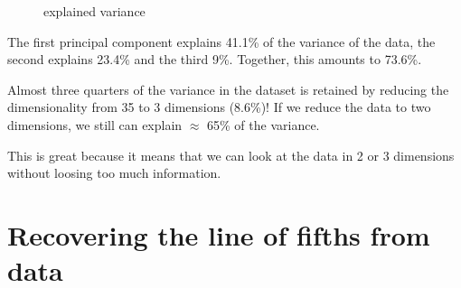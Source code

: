 \documentclass[letterpaper,10pt,english]{sphinxmanual}
\begin{document}
\begin{figure}[htbp]
\centering
\capstart

\noindent{}
\caption{explained variance}\label{\detokenize{data-driven_music_history:id3}}\end{figure}

\begin{sphinxVerbatim}[commandchars=\\\{\}]
\PYG{p}{[}\PYG{p}{]}
\end{sphinxVerbatim}

\begin{sphinxVerbatim}[commandchars=\\\{\}]
\PYG{p}{[}    \PYG{p}{]}
\end{sphinxVerbatim}

The first principal component explains 41.1\% of the variance of the
data, the second explains 23.4\% and the third 9\%. Together, this amounts
to 73.6\%.

Almost three quarters of the variance in the dataset is retained by
reducing the dimensionality from 35 to 3 dimensions (8.6\%)! If we reduce
the data to two dimensions, we still can explain \(\approx\) 65\% of
the variance.

This is great because it means that we can look at the data in 2 or 3
dimensions without loosing too much information.


\section{Recovering the line of fifths from data}
\label{\detokenize{data-driven_music_history:recovering-the-line-of-fifths-from-data}}
\begin{sphinxVerbatim}[commandchars=\\\{\}]
  

  
\end{sphinxVerbatim}
\end{document}

